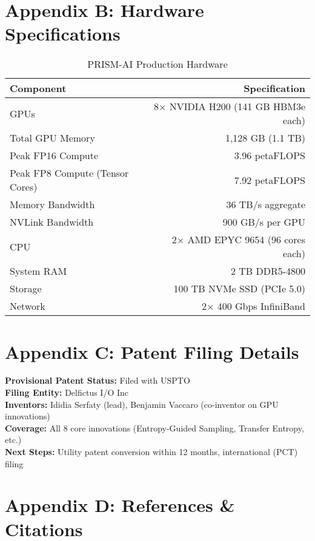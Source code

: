 \documentclass[11pt,letterpaper]{article}
\begin{document}
\section*{Appendix B: Hardware Specifications}

\begin{table}[H]
\centering
\begin{tabularx}{\textwidth}{Xr}
\toprule
\textbf{Component} & \textbf{Specification} \\
\midrule
GPUs & 8× NVIDIA H200 (141 GB HBM3e each) \\
Total GPU Memory & 1,128 GB (1.1 TB) \\
Peak FP16 Compute & 3.96 petaFLOPS \\
Peak FP8 Compute (Tensor Cores) & 7.92 petaFLOPS \\
Memory Bandwidth & 36 TB/s aggregate \\
NVLink Bandwidth & 900 GB/s per GPU \\
CPU & 2× AMD EPYC 9654 (96 cores each) \\
System RAM & 2 TB DDR5-4800 \\
Storage & 100 TB NVMe SSD (PCIe 5.0) \\
Network & 2× 400 Gbps InfiniBand \\
\bottomrule
\end{tabularx}
\caption{PRISM-AI Production Hardware}
\end{table}

\section*{Appendix C: Patent Filing Details}

\textbf{Provisional Patent Status:} Filed with USPTO\\
\textbf{Filing Entity:} Delfictus I/O Inc\\
\textbf{Inventors:} Ididia Serfaty (lead), Benjamin Vaccaro (co-inventor on GPU innovations)\\
\textbf{Coverage:} All 8 core innovations (Entropy-Guided Sampling, Transfer Entropy, etc.)\\
\textbf{Next Steps:} Utility patent conversion within 12 months, international (PCT) filing

\section*{Appendix D: References \& Citations}
\end{document}

